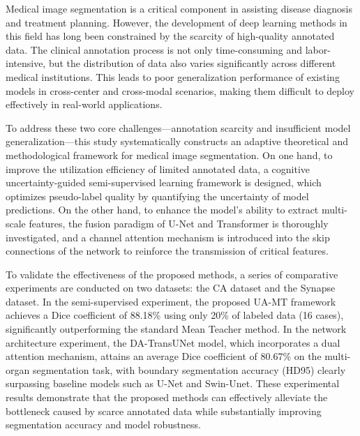 Medical image segmentation is a critical component in assisting disease diagnosis and treatment planning. However, the development of deep learning methods in this field has long been constrained by the scarcity of high-quality annotated data. The clinical annotation process is not only time-consuming and labor-intensive, but the distribution of data also varies significantly across different medical institutions. This leads to poor generalization performance of existing models in cross-center and cross-modal scenarios, making them difficult to deploy effectively in real-world applications.

To address these two core challenges—annotation scarcity and insufficient model generalization—this study systematically constructs an adaptive theoretical and methodological framework for medical image segmentation. On one hand, to improve the utilization efficiency of limited annotated data, a cognitive uncertainty-guided semi-supervised learning framework is designed, which optimizes pseudo-label quality by quantifying the uncertainty of model predictions. On the other hand, to enhance the model's ability to extract multi-scale features, the fusion paradigm of U-Net and Transformer is thoroughly investigated, and a channel attention mechanism is introduced into the skip connections of the network to reinforce the transmission of critical features.

To validate the effectiveness of the proposed methods, a series of comparative experiments are conducted on two datasets: the CA dataset and the Synapse dataset. In the semi-supervised experiment, the proposed UA-MT framework achieves a Dice coefficient of 88.18\% using only 20\% of labeled data (16 cases), significantly outperforming the standard Mean Teacher method. In the network architecture experiment, the DA-TransUNet model, which incorporates a dual attention mechanism, attains an average Dice coefficient of 80.67\% on the multi-organ segmentation task, with boundary segmentation accuracy (HD95) clearly surpassing baseline models such as U-Net and Swin-Unet. These experimental results demonstrate that the proposed methods can effectively alleviate the bottleneck caused by scarce annotated data while substantially improving segmentation accuracy and model robustness.